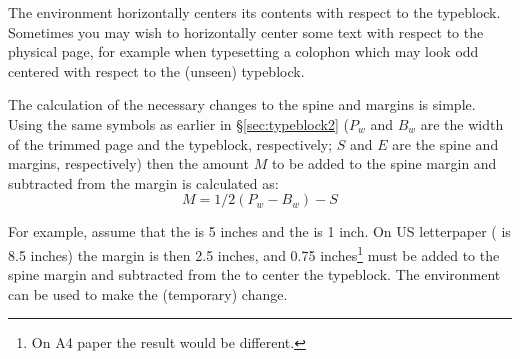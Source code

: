     The  environment horizontally centers its contents
with respect to the typeblock. 
Sometimes you may wish to horizontally center some text with respect
to the physical page, for example when typesetting a 
colophon which may look odd centered with respect
to the (unseen) typeblock.

    The calculation of the necessary changes to the spine and \foredge{}
margins is simple. Using the same symbols as earlier in 
\S\ref{sec:typeblock2} ($P_{w}$ and $B_{w}$ are the width of the trimmed 
page and the typeblock, respectively;
$S$ and $E$ are the spine and \foredge{} margins, 
respectively) then the amount $M$ to be added to the spine 
margin and subtracted from the
\foredge{} margin is calculated as:
\begin{displaymath}
 M = 1/2(P_{w} - B_{w}) - S
\end{displaymath}

For example, assume that the \lnc{\textwidth} is 5 inches and the 
\lnc{\spinemargin} is 1 inch. On US letterpaper 
(\lnc{\paperwidth} is 8.5 inches) the \foredge{} margin is 
then 2.5 inches, and 0.75 inches\footnote{On A4
paper the result would be different.}  must be added to the spine 
margin and subtracted from the \foredge{} to center the 
typeblock. 
The  environment can be used to make the (temporary) change.
\begin{lcode}
\end{lcode}

